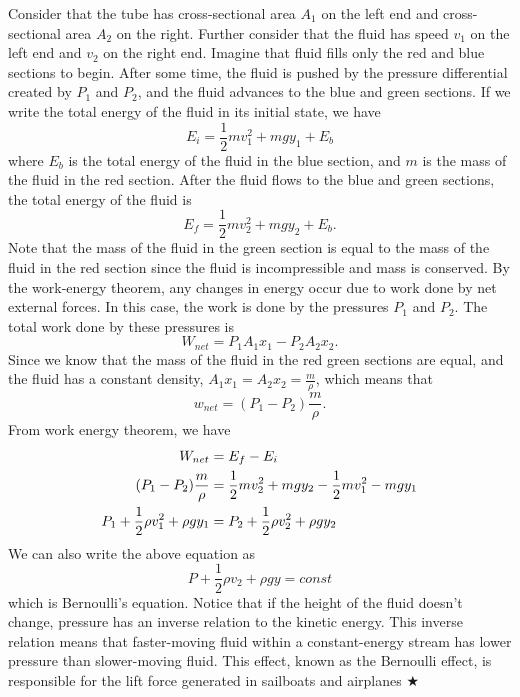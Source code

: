 \noindent Consider that the tube has cross-sectional area $A_1$ on the left end and cross-sectional area $A_2$ on the right. Further consider that the fluid has speed $v_1$ on the left end and $v_2$ on the right end. Imagine that fluid fills only the red and blue sections to begin. After some time, the fluid is pushed by the pressure differential created by $P_1$ and $P_2$, and the fluid advances to the blue and green sections. If we write the total energy of the fluid in its initial state, we have
\begin{equation*}
    E_i = \frac12 mv_1^2 + mgy_1 + E_b
\end{equation*}
\noindent where $E_b$ is the total energy of the fluid in the blue section, and $m$ is the mass of the fluid in the red section. After the fluid flows to the blue and green sections, the total energy of the fluid is 
\begin{equation*}
    E_f = \frac12 mv_2^2 + mgy_2 + E_b.
\end{equation*}
\noindent Note that the mass of the fluid in the green section is equal to the mass of the fluid in the red section since the fluid is incompressible and mass is conserved. By the work-energy theorem, any changes in energy occur due to work done by net external forces. In this case, the work is done by the pressures $P_1$ and $P_2$. The total work done by these pressures is 
\begin{equation*}
    W_{net} = P_1A_1x_1 - P_2A_2x_2.
\end{equation*}
\noindent Since we know that the mass of the fluid in the red green sections are equal, and the fluid has a constant density, $A_1x_1 = A_2x_2 = \frac{m}{\rho}$, which means that
\begin{equation*}
    w_{net} = (P_1 - P_2)\frac{m}{\rho}.
\end{equation*}
\noindent From work energy theorem, we have
\begin{align}
    W_{net} &= E_f - E_i \nonumber \\
    (P_1 - P_2)\frac{m}{\rho} &= \frac12 mv_2^2 + mgy_2 -\frac12 mv_1^2 - mgy_1 \nonumber \\
    P_1 + \frac12 \rho v_1^2 + \rho gy_1 &= P_2 + \frac12 \rho v_2^2 + \rho g y_2
\end{align}
\noindent We can also write the above equation as
\begin{equation}
    \boxed{P + \frac12 \rho v_2 + \rho gy = const}
\end{equation}
\noindent which is Bernoulli's equation. Notice that if the height of the fluid doesn't change, pressure has an inverse relation to the kinetic energy. This inverse relation means that faster-moving fluid within a constant-energy stream has lower pressure than slower-moving fluid. This effect, known as the Bernoulli effect, is responsible for the lift force generated in sailboats and airplanes $\bigstar$
